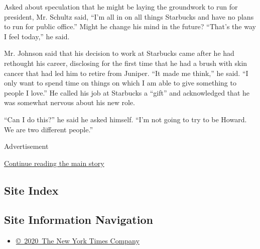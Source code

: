 Asked about speculation that he might be laying the groundwork to run
for president, Mr. Schultz said, ``I'm all in on all things Starbucks
and have no plans to run for public office.'' Might he change his mind
in the future? ``That's the way I feel today,'' he said.

Mr. Johnson said that his decision to work at Starbucks came after he
had rethought his career, disclosing for the first time that he had a
brush with skin cancer that had led him to retire from Juniper. ``It
made me think,'' he said. ``I only want to spend time on things on which
I am able to give something to people I love.'' He called his job at
Starbucks a ``gift'' and acknowledged that he was somewhat nervous about
his new role.

``Can I do this?'' he said he asked himself. ``I'm not going to try to
be Howard. We are two different people.''

Advertisement

\protect\hyperlink{after-bottom}{Continue reading the main story}

\hypertarget{site-index}{%
\subsection{Site Index}\label{site-index}}

\hypertarget{site-information-navigation}{%
\subsection{Site Information
Navigation}\label{site-information-navigation}}

\begin{itemize}
\tightlist
\item
  \href{https://help.nytimes3xbfgragh.onion/hc/en-us/articles/115014792127-Copyright-notice}{©~2020~The
  New York Times Company}
\end{itemize}

